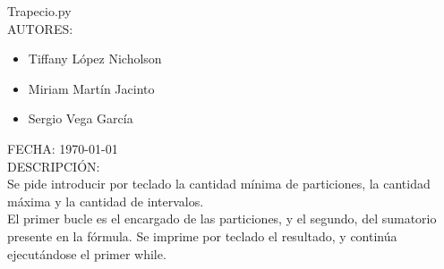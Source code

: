 \documentclass{article}
\begin{document}
   Trapecio.py\\
   
   AUTORES:

   \begin{itemize}
     \item Tiffany López Nicholson
     \item Miriam Martín Jacinto
     \item Sergio Vega García
   \end{itemize}

   FECHA: \today \\

   DESCRIPCIÓN:\\

     Se pide introducir por teclado la cantidad mínima de particiones, la cantidad máxima y la cantidad de intervalos.\\

     El primer bucle es el encargado de las particiones, y el segundo, del sumatorio presente en la fórmula. Se imprime por teclado el resultado, y continúa ejecutándose el primer while.\\
   

\end{document}
